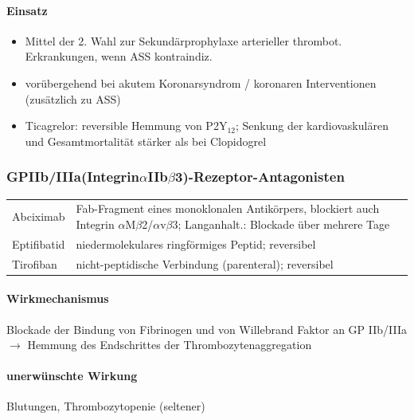 \documentclass[10pt,a4paper]{report}
\begin{document}
\paragraph{Einsatz} %
\label{par:einsatz}
\begin{itemize}
	\item Mittel der 2. Wahl zur Sekundärprophylaxe arterieller thrombot. Erkrankungen, wenn ASS kontraindiz.
	\item vorübergehend bei akutem Koronarsyndrom / koronaren Interventionen (zusätzlich zu ASS)
	\item Ticagrelor: reversible Hemmung von P2Y$_12$; Senkung der kardiovaskulären und Gesamtmortalität stärker als bei Clopidogrel
\end{itemize}
\subsubsection{GPIIb/IIIa(Integrin$\alpha$IIb$\beta$3)-Rezeptor-Antagonisten} %
\label{ssub:gpiib_iiia_integrin_iib_3_rezeptor_antagonisten}
\begin{tabularx}{\textwidth}{XX}
Abciximab&Fab-Fragment eines monoklonalen Antikörpers, 	blockiert auch 	Integrin $\alpha$M$\beta$2/$\alpha$v$\beta$3; Langanhalt.: Blockade über mehrere Tage\\
Eptifibatid&niedermolekulares ringförmiges Peptid; reversibel\\
Tirofiban&nicht-peptidische Verbindung (parenteral); reversibel\\
\end{tabularx}
\paragraph{Wirkmechanismus} %
\label{par:wirkmechanismus}
Blockade der Bindung von Fibrinogen und von Willebrand Faktor an GP IIb/IIIa $\rightarrow$ Hemmung des Endschrittes der Thrombozytenaggregation
\paragraph{unerwünschte Wirkung} %
\label{par:unerw_nschte_wirkung}
Blutungen, Thrombozytopenie (seltener)
\end{document}

